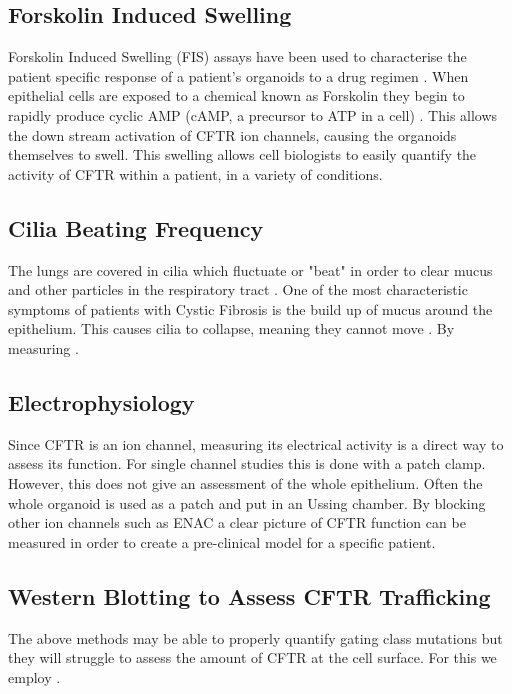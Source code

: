 \subsection{Forskolin Induced Swelling}
Forskolin Induced Swelling (FIS) assays have been used to characterise the patient specific response of a patient's organoids to a drug regimen \cite{dekkers2013}. When epithelial cells are exposed to a chemical known as Forskolin they begin to rapidly produce cyclic AMP (cAMP, a precursor to ATP in a cell) \cite{}. This allows the down stream activation of CFTR ion channels, causing the organoids themselves to swell. This swelling allows cell biologists to easily quantify the activity of CFTR within a patient, in a variety of conditions.

\subsection{Cilia Beating Frequency}
The lungs are covered in cilia which fluctuate or "beat" in order to clear mucus and other particles in the respiratory tract \cite{mitchison2010, bustamante-marin2017}. One of the most characteristic symptoms of patients with Cystic Fibrosis is the build up of mucus around the epithelium. This causes cilia to collapse, meaning they cannot move \cite{}. By measuring .

\subsection{Electrophysiology}
Since CFTR is an ion channel, measuring its electrical activity is a direct way to assess its function. For single channel studies this is done with a patch clamp. However, this does not give an assessment of the whole epithelium. Often the whole organoid is used as a patch and put in an Ussing chamber. By blocking other ion channels such as ENAC a clear picture of CFTR function can be measured in order to create a pre-clinical model for a specific patient.

\subsection{Western Blotting to Assess CFTR Trafficking}
The above methods may be able to properly quantify gating class mutations but they will struggle to assess the amount of CFTR at the cell surface. For this we employ .
